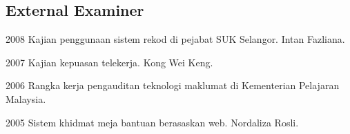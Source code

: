 \documentclass[a4paper]{article}
\begin{document}
\subsection*{External Examiner}
\begin{CV}
\item[2008] Kajian penggunaan sistem rekod di pejabat SUK Selangor. Intan Fazliana.
\item[2007] Kajian kepuasan telekerja. Kong Wei Keng.
\item[2006] Rangka kerja pengauditan teknologi maklumat di Kementerian Pelajaran Malaysia.
\item[2005] Sistem khidmat meja bantuan berasaskan web. Nordaliza Rosli.
\end{CV}
\end{document}
